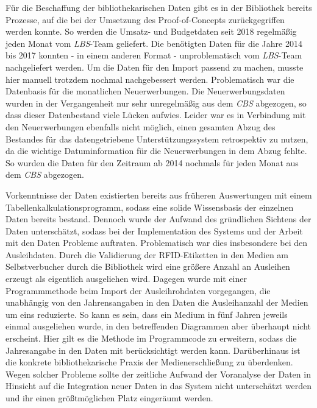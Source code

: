 Für die Beschaffung der bibliothekarischen Daten gibt es in der Bibliothek bereits Prozesse, auf die bei der Umsetzung des Proof-of-Concepts 
zurückgegriffen werden konnte. So werden die Umsatz- und Budgetdaten seit 2018 regelmäßig jeden Monat vom \textit{\acrshort{LBS}}-Team geliefert. Die benötigten Daten für die 
Jahre 2014 bis 2017 konnten - in einem anderen Format - unproblematisch vom \textit{\acrshort{LBS}}-Team nachgeliefert werden. Um die Daten für den Import passend zu machen, 
musste hier manuell trotzdem nochmal nachgebessert werden. Problematisch war die Datenbasis für die monatlichen Neuerwerbungen. Die Neuerwerbungsdaten wurden 
in der Vergangenheit nur sehr unregelmäßig aus dem \textit{\acrshort{CBS}} abgezogen, so dass dieser Datenbestand viele Lücken aufwies. Leider war es in Verbindung mit den Neuerwerbungen 
ebenfalls nicht möglich, einen gesamten Abzug des Bestandes für das datengetriebene Unterstützungssystem retrospektiv zu nutzen, da die wichtige Datuminformation für die 
Neuerwerbungen in dem Abzug fehlte. So wurden die Daten für den Zeitraum ab 2014 nochmals für jeden Monat aus dem \textit{\acrshort{CBS}} abgezogen. 

Vorkenntnisse der Daten existierten bereits aus früheren Auswertungen mit einem Tabellenkalkulationsprogramm, sodass eine solide Wissensbasis 
der einzelnen Daten bereits bestand. Dennoch wurde der Aufwand des gründlichen Sichtens der Daten unterschätzt, sodass bei 
der Implementation des Systems und der Arbeit mit den Daten Probleme auftraten. 
Problematisch war dies insbesondere bei den Ausleihdaten. Durch die Validierung der RFID-Etiketten in
den Medien am Selbstverbucher durch die Bibliothek wird eine größere Anzahl an Ausleihen erzeugt als eigentlich ausgeliehen wird. 
Dagegen wurde mit einer Programmmethode beim Import der Ausleihrohdaten vorgegangen, die unabhängig von den Jahrensangaben in den Daten die Ausleihanzahl der Medien um eins reduzierte. 
So kann es sein, dass ein Medium in fünf Jahren jeweils einmal ausgeliehen wurde, in den betreffenden Diagrammen aber überhaupt nicht erscheint. 
Hier gilt es die Methode im Programmcode zu erweitern, sodass die Jahresangabe in den Daten mit berücksichtigt werden kann. Darüberhinaus ist die konkrete bibliothekarische Praxis der Medienerschließung zu überdenken.
Wegen solcher Probleme sollte der zeitliche Aufwand der Voranalyse der Daten in Hinsicht auf die Integration neuer
Daten in das System nicht unterschätzt werden und ihr einen größtmöglichen Platz eingeräumt werden. 


